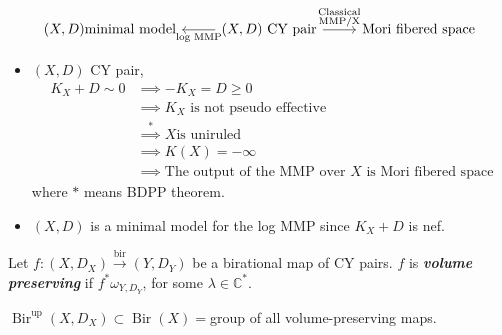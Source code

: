 \[\begin{tikzcd}
	(X,D)\text{minimal model}& \arrow[l,"\text{log MMP}" ](X,D)\text{ CY pair} \arrow[r,"\substack{\text{Classical}\\\text{MMP/X}}"  ]&\text{Mori fibered space} 
\end{tikzcd}\]

\begin{itemize}
	\item $(X,D)$ CY pair,
\begin{align*}
	K_{X}+D\sim 0 &\implies -K_X=D\geq 0\\
	&\implies K_X\text{ is not pseudo effective}\\
	&\overset{*}{\implies } X \text{is uniruled}\\
	&\implies K(X)=-\infty\\
	&\implies \text{The output of the  MMP over $X$ is Mori fibered space} 
\end{align*}
where $*$ means BDPP theorem.

	\item $(X,D)$ is a minimal model for the log MMP since $K_X+D$ is nef.
\end{itemize}

\begin{example}
	[content…]
\end{example}

\begin{defn}
	Let $f:(X,D_X)\overset{\operatorname{bir}}{\longrightarrow}(Y,D_Y)$ be a birational map of CY pairs. $f$ is \textit{\textbf{volume preserving}} if $f^* \omega_{Y,D_Y}$, for some $\lambda\in\mathbb{C}^*$.
\end{defn}

\begin{remark}
	$\operatorname{Bir}^{\operatorname{up}}(X,D_X) \subset \operatorname{Bir}(X)=$group of all volume-preserving maps.
\end{remark}

